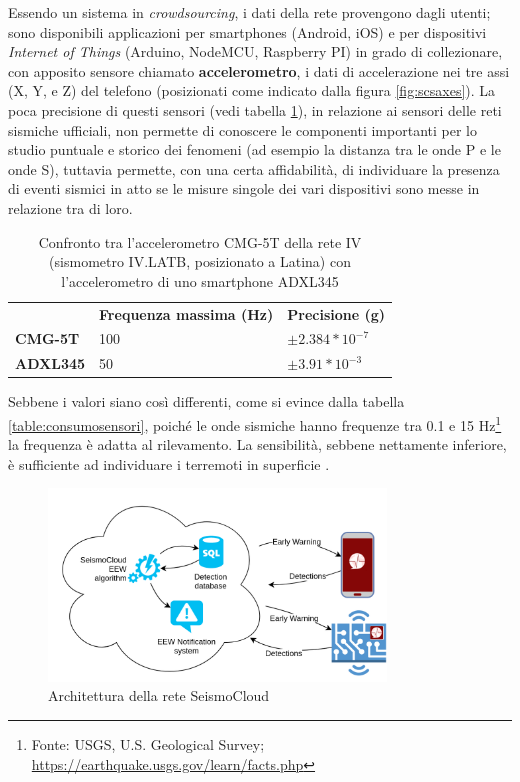 \documentclass[a4paper,10pt]{memoir}
\begin{document}
Essendo un sistema in \textit{crowdsourcing}, i dati della rete provengono dagli utenti; sono disponibili applicazioni per smartphones (Android, iOS) e per dispositivi \textit{Internet of Things} (Arduino, NodeMCU, Raspberry PI) in grado di collezionare, con apposito sensore chiamato \textbf{accelerometro}, i dati di accelerazione nei tre assi (X, Y, e Z) del telefono (posizionati come indicato dalla figura \ref{fig:scsaxes}). La poca precisione di questi sensori (vedi tabella \ref{table:datisensori}), in relazione ai sensori delle reti sismiche ufficiali, non permette di conoscere le componenti importanti per lo studio puntuale e storico dei fenomeni (ad esempio la distanza tra le onde P e le onde S), tuttavia permette, con una certa affidabilità, di individuare la presenza di eventi sismici in atto se le misure singole dei vari dispositivi sono messe in relazione tra di loro.

\begin{table}[h]
\centering
\caption{Confronto tra l'accelerometro CMG-5T della rete IV (sismometro IV.LATB, posizionato a Latina) con l'accelerometro di uno smartphone ADXL345}
\label{table:datisensori}
\begin{tabular}{lll}
                    & \textbf{Frequenza massima (Hz)} & \textbf{Precisione (g)} \\
\textbf{CMG-5T} \cite{ivlatb} & 100 & $\pm 2.384 * 10^{-7}$ \\
\textbf{ADXL345} \cite{accelman}          & 50 & $\pm 3.91 * 10^{-3}$
\end{tabular}
\end{table}

Sebbene i valori siano così differenti, come si evince dalla tabella \ref{table:consumosensori}, poiché le onde sismiche hanno frequenze tra 0.1 e 15 Hz\footnote{Fonte: USGS, U.S. Geological Survey; \url{https://earthquake.usgs.gov/learn/facts.php}} la frequenza è adatta al rilevamento. La sensibilità, sebbene nettamente inferiore, è sufficiente ad individuare i terremoti in superficie \cite{finazzi}.

\begin{figure}[ht]
\centering
\label{fig:scsarch}
\caption{Architettura della rete SeismoCloud}
\includegraphics[width=0.8\textwidth]{introduzione/SeismoCloud_arch}
\end{figure}
\end{document}
